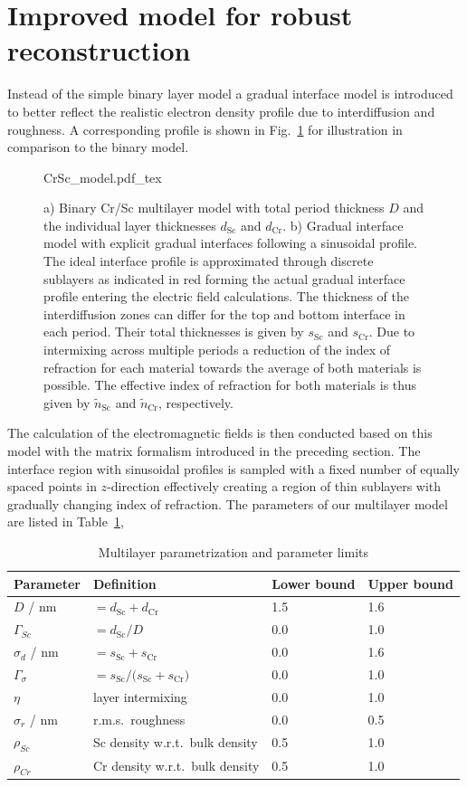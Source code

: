 \section{Improved model for robust reconstruction} \label{sec:model}

Instead of the simple binary layer model a gradual interface model is introduced to better reflect the realistic electron density profile due to interdiffusion and roughness. A corresponding profile is shown in Fig.~\ref{fig:CrScModel} for illustration in comparison to the binary model.
\begin{figure}
  {CrSc_model.pdf_tex}
  \caption{a) Binary Cr/Sc multilayer model with total period thickness $D$ and the individual layer thicknesses $d_\text{Sc}$ and $d_\text{Cr}$. b) Gradual interface model with explicit gradual interfaces following a sinusoidal profile. The ideal interface profile is approximated through discrete sublayers as indicated in red forming the actual gradual interface profile entering the electric field calculations. The thickness of the interdiffusion zones can differ for the top and bottom interface in each period. Their total thicknesses is given by $s_\text{Sc}$ and $s_\text{Cr}$. Due to intermixing across multiple periods a reduction of the index of refraction for each material towards the average of both materials is possible. The effective index of refraction for both materials is thus given by $\tilde{n}_\text{Sc}$ and $\tilde{n}_\text{Cr}$, respectively.}
  \label{fig:CrScModel}
\end{figure}
The calculation of the electromagnetic fields is then conducted based on this model with the matrix formalism introduced in the preceding section. The interface region with sinusoidal profiles is sampled with a fixed number of equally spaced points in $z$-direction effectively creating a region of thin sublayers with gradually changing index of refraction. The parameters of our multilayer model are listed in Table~\ref{tbl:parametrization},
\begin{table}
\centering
\caption{Multilayer parametrization and parameter limits}
\label{tbl:parametrization}
\begin{tabular}{@{}llll@{}}
\toprule
Parameter & Definition & Lower bound & Upper bound\\ \midrule
$D$ / nm & $= d_\text{Sc} + d_\text{Cr}$ & 1.5&1.6 \\ 
$\Gamma_{Sc}$ & $= d_\text{Sc} / D$&0.0 &1.0 \\ 
$\sigma_d$ / nm&$=s_\text{Sc} + s_\text{Cr}$&0.0 & 1.6\protect\footnotemark\\ 
$\Gamma_\sigma$ &$= s_\text{Sc} / \big(s_\text{Sc} + s_\text{Cr}\big)$& 0.0& 1.0\\ 
$\eta$ &layer intermixing& 0.0& 1.0\\ 
$\sigma_r$ / nm & r.m.s.~roughness& 0.0& 0.5\\ 
$\rho_{Sc}$ &Sc density w.r.t.~bulk density & 0.5& 1.0\\ 
$\rho_{Cr}$ &Cr density w.r.t.~bulk density& 0.5& 1.0\\ 
 \bottomrule
\end{tabular}
\end{table}
